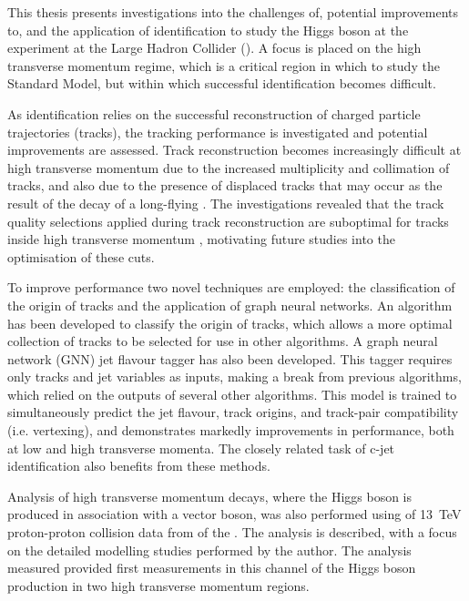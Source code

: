 
This thesis presents investigations into the challenges of, potential improvements to, and the application of \bjet identification to study the Higgs boson at the \ATLAS experiment at the Large Hadron Collider (\LHC).
A focus is placed on the high transverse momentum regime, which is a critical region in which to study the Standard Model, but within which successful \bjet identification becomes difficult.

As \bjet identification relies on the successful reconstruction of charged particle trajectories (tracks), the tracking performance is investigated and potential improvements are assessed.
Track reconstruction becomes increasingly difficult at high transverse momentum due to the increased multiplicity and collimation of tracks, and also due to the presence of displaced tracks that may occur as the result of the decay of a long-flying \bhadron.
The investigations revealed that the track quality selections applied during track reconstruction are suboptimal for tracks inside high transverse momentum \bjets, motivating future studies into the optimisation of these cuts.

To improve \btagging performance two novel techniques are employed: the classification of the origin of tracks and the application of graph neural networks.
An algorithm has been developed to classify the origin of tracks, which allows a more optimal collection of tracks to be selected for use in other algorithms. A graph neural network (GNN) jet flavour tagger has also been developed.
This tagger requires only tracks and jet variables as inputs, making a break from previous algorithms, which relied on the outputs of several other algorithms.
This model is trained to simultaneously predict the jet flavour, track origins, and track-pair compatibility (i.e. vertexing), and demonstrates markedly improvements in \btagging performance, both at low and high transverse momenta.
The closely related task of c-jet identification also benefits from these methods.

Analysis of high transverse momentum \Hbb decays, where the Higgs boson is produced in association with a vector boson, was also performed using \intlumi of \SI{13}{\TeV} proton-proton collision data from \runtwo of the \LHC.
The analysis is described, with a focus on the detailed modelling studies performed by the author.
The analysis measured provided first measurements in this channel of the Higgs boson production in two high transverse momentum regions. 
